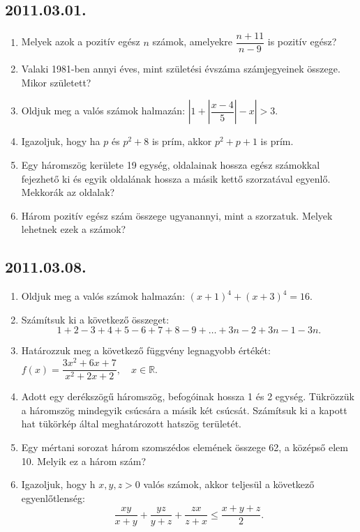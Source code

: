 \documentclass{article}
\begin{document}
\subsection*{2011.03.01.}
\begin{enumerate}
\item Melyek azok a pozitív egész $n$ számok, amelyekre $\dfrac{n+11}{n-9}$ is pozitív egész?
\item Valaki 1981-ben annyi éves, mint születési évszáma számjegyeinek összege. Mikor született?
\item Oldjuk meg a valós számok halmazán: 
$\left| 1+\left|\dfrac{x-4}{5}\right|-x\right|>3$.
\item Igazoljuk, hogy ha $p$ és $p^2+8$ is prím, akkor $p^2+p+1$ is prím.
\item Egy háromszög kerülete 19 egység, oldalainak hossza egész számokkal fejezhető ki és egyik oldalának hossza a másik kettő szorzatával egyenlő. Mekkorák az oldalak?
\item Három pozitív egész szám összege ugyanannyi, mint a szorzatuk. Melyek lehetnek ezek a számok?
\end{enumerate}

\subsection*{2011.03.08.}
\begin{enumerate}
\item Oldjuk meg a valós számok halmazán: $(x+1)^4+(x+3)^4=16$.
\item Számítsuk ki a következő összeget:
$$1+2-3+4+5-6+7+8-9+\ldots+3n-2+3n-1-3n.$$
\item Határozzuk meg a következő függvény legnagyobb értékét:$f(x)=\dfrac{3x^2+6x+7}{x^2+2x+2},\quad x\in\mathbb{R}$.
\item Adott egy derékszögű háromszög, befogóinak hossza 1 és 2 egység. Tükrözzük a háromszög mindegyik csúcsára a másik két csúcsát. Számítsuk ki a kapott hat tükörkép által meghatározott hatszög területét.
\item Egy mértani sorozat három szomszédos elemének összege 62, a középső elem 10. 
Melyik ez a három szám?
\item Igazoljuk, hogy h $x,y,z>0$ valós számok, akkor teljesül a következő egyenlőtlenség:
$$\dfrac{xy}{x+y}+\dfrac{yz}{y+z}+\dfrac{zx}{z+x}\le\dfrac{x+y+z}{2}.$$
\end{enumerate}
\end{document}
